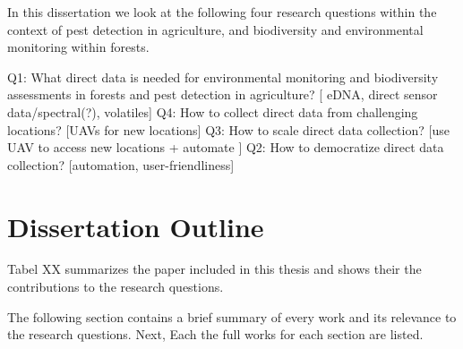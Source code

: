 %
In this dissertation we look at the following four research questions within the context of pest detection in agriculture, and biodiversity and environmental monitoring within forests.


Q1: What direct data is needed for environmental monitoring and biodiversity assessments in forests and pest detection in agriculture? [ eDNA, direct sensor data/spectral(?), volatiles]
Q4: How to collect direct data from challenging locations? [UAVs for new locations]
Q3: How to scale direct data collection? [use UAV to access new locations + automate ]
Q2: How to democratize direct data collection? [automation, user-friendliness]


\section{Dissertation Outline}

Tabel XX summarizes the paper included in this thesis and shows their the contributions to the research questions. 

The following section contains a brief summary of every work and its relevance to the research questions. Next, Each the full works for each section are listed.

